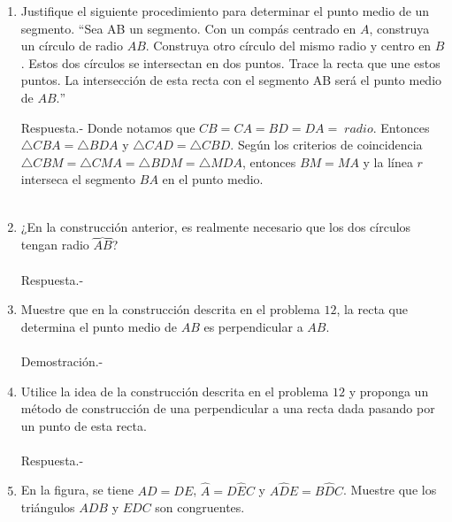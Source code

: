 \documentclass[10pt]{article}
\begin{document}
\begin{enumerate}
	\item Justifique el siguiente procedimiento para determinar el punto medio de un segmento. $“$Sea AB un segmento. Con un compás centrado en $A$, construya un círculo de radio $AB$. Construya otro círculo del mismo radio y centro en $B$. Estos dos círculos se intersectan en dos puntos. Trace la recta que une estos puntos. La intersección de esta recta con el segmento AB será el punto medio de $AB$.$”$

	\begin{center}
	\end{center}

	Respuesta.- Donde notamos que $CB = CA = BD = DA = \; radio$. Entonces $\triangle CBA = \triangle BDA$ y $\triangle CAD = \triangle CBD$. Según los criterios de coincidencia $\triangle CBM = \triangle CMA = \triangle BDM = \triangle MDA$, entonces $BM = MA$ y la línea $r$ interseca el segmento $BA$ en el punto medio.\\\\

	\item ¿En la construcción anterior, es realmente necesario que los dos círculos tengan radio $\overbrace{AB}$?\\\\
	Respuesta.-\;

	\item Muestre que en la construcción descrita en el problema $12$, la recta que determina el punto medio de $AB$ es perpendicular a $AB$.\\\\
	Demostración.-\;

	\item Utilice la idea de la construcción descrita en el problema $12$ y proponga un método de construcción de una perpendicular a una recta dada pasando por un punto de esta recta.\\\\
	Respuesta.-\;

	\item En la figura, se tiene $AD=DE$, $\widehat{A}=D\widehat{E}C$ y $A\widehat{D}E=B\widehat{D}C$. Muestre que los triángulos $ADB$ y $EDC$ son congruentes.
	

\end{enumerate}
\end{document}
